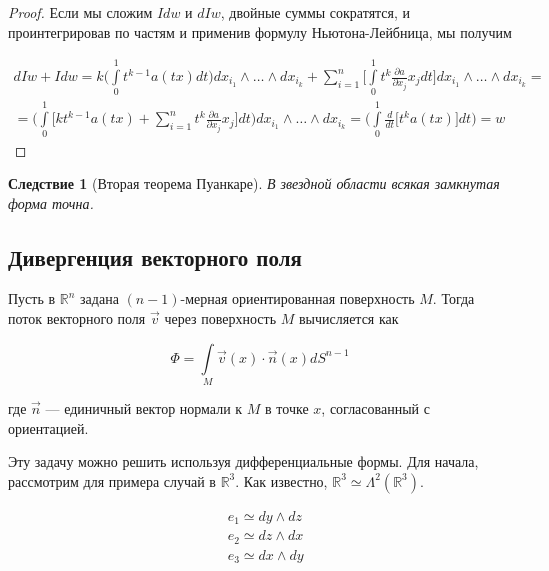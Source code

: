 \documentclass[a5paper]{article}
\newcounter{through}
\theoremstyle{plain}
\newtheorem{corollary}[through]{Следствие}
\theoremstyle{definition}
\numberwithin{through}{section}
\numberwithin{equation}{section}
\begin{document}
\begin{proof}
	Если мы сложим $I dw$ и $d Iw$, двойные суммы сократятся, и проинтегрировав по частям и применив формулу Ньютона-Лейбница, мы получим
	
	\begin{multline*}
		d Iw + Idw = k \bigg( \int\limits_{0}^{1} t^{k-1}a(tx)dt \bigg) dx_{i_1} \wedge \ldots \wedge dx_{i_k} + \sum\limits_{i = 1}^{n} \bigg[ \int\limits_{0}^{1} t^{k} \frac{\partial a}{\partial x_j} x_j dt \bigg] dx_{i_1} \wedge \ldots \wedge dx_{i_k} = \\ = \bigg( \int\limits_{0}^{1} \bigg[ kt^{k-1}a(tx) + \sum\limits_{i = 1}^{n} t^{k} \frac{\partial a}{\partial x_j} x_j \bigg] dt \bigg)  dx_{i_1} \wedge \ldots \wedge dx_{i_k} = \bigg(\int\limits_{0}^{1} \frac{d}{dt}\bigg[ t^k a(tx) \bigg] dt \bigg) = w
	\end{multline*} 
\end{proof}

\begin{corollary}[Вторая теорема Пуанкаре]
	В звездной области всякая замкнутая форма точна.
\end{corollary}







\subsection{Дивергенция векторного поля}

Пусть в $\mathbb{R}^n$ задана $(n-1)$-мерная ориентированная поверхность $M$. Тогда поток векторного поля $\vec{v}$ через поверхность $M$ вычисляется как

\begin{equation*}
	\Phi = \int\limits_{M} \vec{v}(x) \cdot \vec{n}(x) d S^{n-1} 
\end{equation*}

где $\vec{n}$ --- единичный вектор нормали к $M$ в точке $x$, согласованный с ориентацией.

Эту задачу можно решить используя дифференциальные формы. Для начала, рассмотрим для примера случай в $\mathbb{R}^3$. Как известно, $\mathbb{R}^3 \simeq \Lambda^2 (\mathbb{R}^3)$. 

\begin{align*}
	& e_1 \simeq dy \wedge dz \\
	& e_2 \simeq dz \wedge dx \\
	& e_3 \simeq dx \wedge dy \\
\end{align*}
\end{document}
